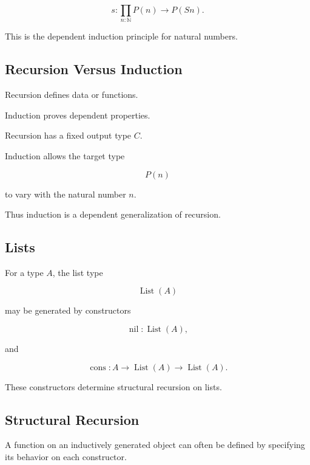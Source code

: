 \[
\boxed{
s:
\prod_{n:\mathbb{N}}
P(n)\to P(Sn).
}
\]

This is the dependent induction principle for natural numbers.

\subsection{Recursion Versus Induction}
\label{subsec:type-theory-recursion-vs-induction}

Recursion defines data or functions.

Induction proves dependent properties.

Recursion has a fixed output type \(C\).

Induction allows the target type

\[
\boxed{
P(n)
}
\]

to vary with the natural number \(n\).

Thus induction is a dependent generalization of recursion.

\subsection{Lists}
\label{subsec:type-theory-lists}

For a type \(A\), the list type

\[
\boxed{
\operatorname{List}(A)
}
\]

may be generated by constructors

\[
\boxed{
\operatorname{nil}
:
\operatorname{List}(A),
}
\]

and

\[
\boxed{
\operatorname{cons}
:
A
\to
\operatorname{List}(A)
\to
\operatorname{List}(A).
}
\]

These constructors determine structural recursion on lists.

\subsection{Structural Recursion}
\label{subsec:structural-recursion-type-theory}

A function on an inductively generated object can often be defined by
specifying its behavior on each constructor.

